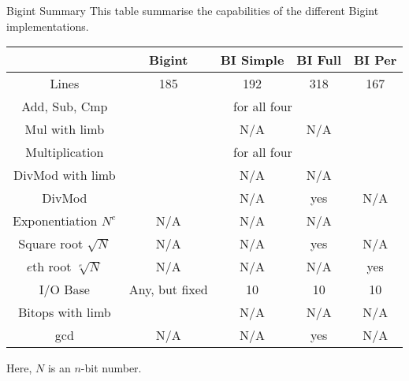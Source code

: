 \begin{algorithm}{Bigint Summary}
\desc
This table summarise the capabilities of the different Bigint
implementations.

\begin{tabular}{|c|c|c|c|c|}
\hline
                  & Bigint & BI Simple & BI Full & BI Per \\
\hline
Lines                        & 185 & 192 & 318 & 167 \\
\hline
Add, Sub, Cmp                & \multicolumn{4}{|c|}{\ordo{n} for all four} \\
\hline
Mul with limb                & \ordo{n} & N/A & N/A & \ordo{n} \\
\hline
Multiplication               & \multicolumn{4}{|c|}{\ordo{n^2} for all four} \\
\hline
DivMod with limb             & \ordo{n} & N/A & N/A & \ordo{n} \\
\hline
DivMod                       & \ordo{n^2} & N/A & yes & N/A \\
\hline
Exponentiation $N^e$         & N/A & N/A & N/A & \ordo{e \cdot n^2} \\
\hline
Square root $\sqrt{N}$       & N/A & N/A & yes & N/A \\
\hline
$e$th root $\sqrt[e]{N}$     & N/A & N/A & N/A & yes \\
\hline
I/O Base                     & Any, but fixed & 10 & 10 & 10\\
\hline
Bitops with limb             & \ordo{1} & N/A & N/A & N/A\\
\hline
gcd                          & N/A & N/A & yes & N/A \\
\hline
\end{tabular}


Here, $N$ is an $n$-bit number.
\end{algorithm}

